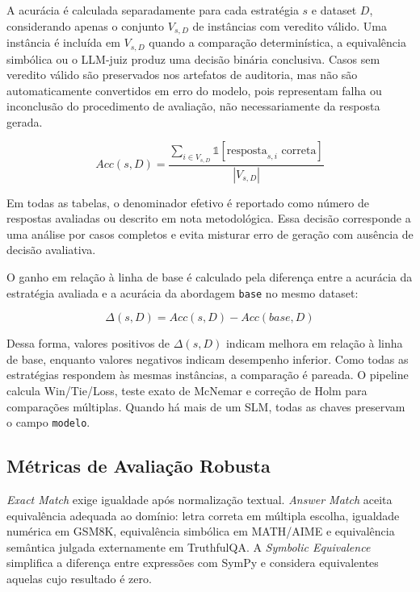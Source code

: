\documentclass[12pt]{article}
\begin{document}
A acurácia é calculada separadamente para cada estratégia \(s\) e dataset \(D\), considerando apenas o conjunto \(V_{s,D}\) de instâncias com veredito válido. Uma instância é incluída em \(V_{s,D}\) quando a comparação determinística, a equivalência simbólica ou o LLM-juiz produz uma decisão binária conclusiva. Casos sem veredito válido são preservados nos artefatos de auditoria, mas não são automaticamente convertidos em erro do modelo, pois representam falha ou inconclusão do procedimento de avaliação, não necessariamente da resposta gerada.

\begin{equation}
Acc(s,D)=
\frac{\sum_{i \in V_{s,D}} \mathbb{1}[\text{resposta}_{s,i}\text{ correta}]}
{|V_{s,D}|}
\end{equation}

Em todas as tabelas, o denominador efetivo é reportado como número de respostas avaliadas ou descrito em nota metodológica. Essa decisão corresponde a uma análise por casos completos e evita misturar erro de geração com ausência de decisão avaliativa.

O ganho em relação à linha de base é calculado pela diferença entre a acurácia da estratégia avaliada e a acurácia da abordagem \texttt{base} no mesmo dataset:

\begin{equation}
\Delta(s,D)=Acc(s,D)-Acc(base,D)
\end{equation}

Dessa forma, valores positivos de \(\Delta(s,D)\) indicam melhora em relação à linha de base, enquanto valores negativos indicam desempenho inferior. Como todas as estratégias respondem às mesmas instâncias, a comparação é pareada. O pipeline calcula Win/Tie/Loss, teste exato de McNemar e correção de Holm para comparações múltiplas. Quando há mais de um SLM, todas as chaves preservam o campo \texttt{modelo}.

\subsection{Métricas de Avaliação Robusta}

\textit{Exact Match} exige igualdade após normalização textual. \textit{Answer Match} aceita equivalência adequada ao domínio: letra correta em múltipla escolha, igualdade numérica em GSM8K, equivalência simbólica em MATH/AIME e equivalência semântica julgada externamente em TruthfulQA. A \textit{Symbolic Equivalence} simplifica a diferença entre expressões com SymPy e considera equivalentes aquelas cujo resultado é zero.
\end{document}
